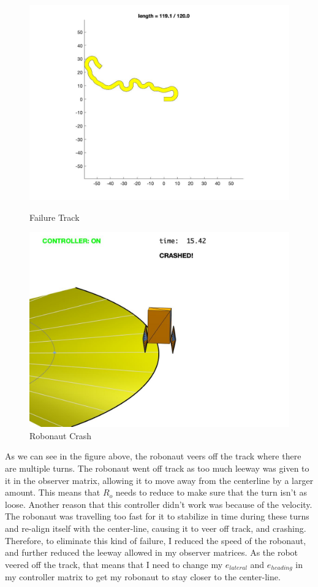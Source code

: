 \documentclass{article}
\begin{document}
 \begin{figure}[H]
\centering
\begin{minipage}{.5\textwidth}
	\centering
	\includegraphics[width=.8\linewidth]{failure 2 track.jpg}
	\caption{Failure Track}
	\end{minipage}%
\begin{minipage}{.5\textwidth}
	\centering
	\includegraphics[width=.8\linewidth]{failure 2 robot.jpg}
	\caption{Robonaut Crash}
\end{minipage}
\end{figure}
As we can see in the figure above, the robonaut veers off the track where there are multiple turns. The robonaut went off track as too much leeway was given to it in the observer matrix, allowing it to move away from the centerline by a larger amount. This means that $R_{o}$ needs to reduce to make sure that the turn isn't as loose. Another reason that this controller didn't work was because of the velocity. The robonaut was travelling too fast for it to stabilize in time during these turns and re-align itself with the center-line, causing it to veer off track, and crashing. Therefore, to eliminate this kind of failure, I reduced the speed of the robonaut, and further reduced the leeway allowed in my observer matrices. As the robot veered off the track, that means that I need to change my $e_{lateral}$ and $e_{heading}$ in my controller matrix to get my robonaut to stay closer to the center-line.
\end{document}
